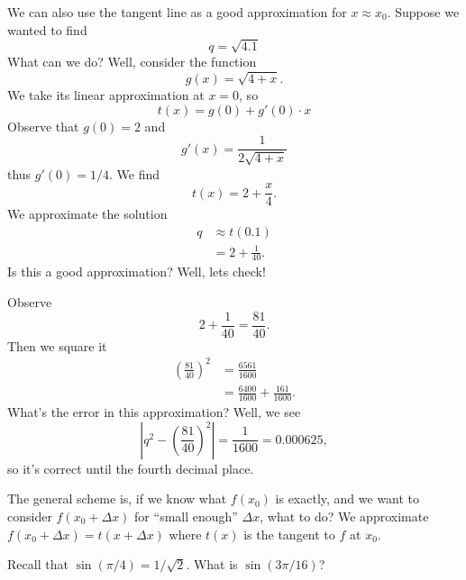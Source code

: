 \begin{ex}
We can also use the tangent line as a good approximation for
$x\approx x_{0}$. Suppose we wanted to find
\begin{equation}
q = \sqrt{4.1}
\end{equation}
What can we do? Well, consider the function
\begin{equation}
g(x)=\sqrt{4+x}.
\end{equation}
We take its linear approximation at $x=0$, so
\begin{equation}
t(x)=g(0) + g'(0)\cdot x
\end{equation}
Observe that $g(0)=2$ and
\begin{equation}
g'(x)=\frac{1}{2\sqrt{4+x}}
\end{equation}
thus $g'(0)=1/4$. We find
\begin{equation}
t(x) = 2 + \frac{x}{4}.
\end{equation}
We approximate the solution
\begin{equation}
\begin{split}
q &\approx t(0.1)\\
&=2+\frac{1}{40}.
\end{split}
\end{equation}
Is this a good approximation? Well, lets check!

Observe
\begin{equation*}
2+\frac{1}{40} = \frac{81}{40}.
\end{equation*}
Then we square it
\begin{equation}
\begin{split}
\left(\frac{81}{40}\right)^{2} &= \frac{6561}{1600}\\
&=\frac{6400}{1600}+\frac{161}{1600}.
\end{split}
\end{equation}
What's the error in this approximation? Well, we see
\begin{equation}
\left|q^{2}-\left(\frac{81}{40}\right)^{2}\right| =
\frac{1}{1600} = 0.000625,
\end{equation}
so it's correct until the fourth decimal place.
\end{ex}
\begin{rmk}
The general scheme is, if we know what $f(x_{0})$ is exactly, and
we want to consider $f(x_{0}+\Delta x)$ for ``small enough''
$\Delta x$, what to do? We approximate $f(x_{0}+\Delta
x)=t(x+\Delta x)$ where $t(x)$ is the tangent to $f$ at $x_{0}$. 
\end{rmk}

\begin{xca}
Recall that $\sin(\pi/4)=1/\sqrt{2}$. What is $\sin(3\pi/16)$?
\end{xca}
